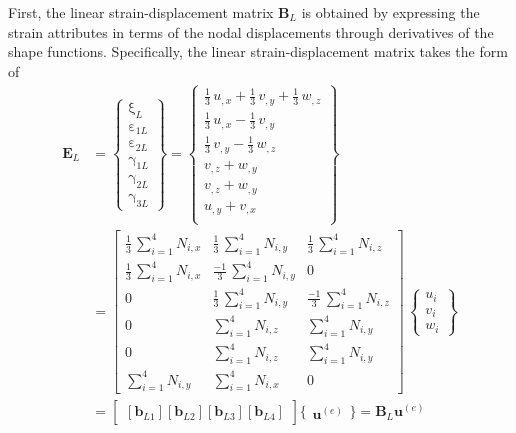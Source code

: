 First, the linear strain-displacement matrix $\mathbf{B}_L$ is obtained by expressing the strain attributes in terms of the nodal displacements through derivatives of the shape functions. Specifically, the linear strain-displacement matrix takes the form of
\begin{equation}
\begin{aligned}
\mathbf{E}_L & =  \begin{Bmatrix}
\mathrm \xi_{L} \\
\mathrm \varepsilon_{1L} \\
\mathrm \varepsilon_{2L} \\
\mathrm \gamma_{1L} \\
\mathrm \gamma_{2L} \\
\mathrm \gamma_{3L}\end{Bmatrix} = 
\begin{Bmatrix}
\tfrac{1}{3} \, u_{,x} + \tfrac{1}{3} \, v_{,y} + \tfrac{1}{3} \, w_{,z} \\
\tfrac{1}{3} \, u_{,x} - \tfrac{1}{3} \, v_{,y} \\
\tfrac{1}{3} \, v_{,y} - \tfrac{1}{3} \, w_{,z} \\
v_{,z} +  w_{,y} \\ 
v_{,z} +  w_{,y} \\ 
u_{,y} +  v_{,x} \\\end{Bmatrix} \\
& = \begin{bmatrix}
\tfrac{1}{3} \, \sum\nolimits_{i=1}^4 N_{i,x}  & \tfrac{1}{3} \, \sum\nolimits_{i=1}^4 N_{i,y} & \tfrac{1}{3} \, \sum\nolimits_{i=1}^4 N_{i,z} \\
\tfrac{1}{3} \, \sum\nolimits_{i=1}^4 N_{i,x}  & \tfrac{-1}{3} \, \sum\nolimits_{i=1}^4 N_{i,y} & 0 \\ 
0 & \tfrac{1}{3} \, \sum\nolimits_{i=1}^4 N_{i,y}  &  \tfrac{-1}{3} \, \sum\nolimits_{i=1}^4 N_{i,z} \\  
0 & \sum\nolimits_{i=1}^4 N_{i,z}  &  \sum\nolimits_{i=1}^4 N_{i,y} \\ 
0 & \sum\nolimits_{i=1}^4 N_{i,z}  &  \sum\nolimits_{i=1}^4 N_{i,y} \\ 
\sum\nolimits_{i=1}^4 N_{i,y}  &  \sum\nolimits_{i=1}^4 N_{i,x} & 0 \end{bmatrix} \, \begin{Bmatrix}
u_{i} \\
v_{i} \\
w_{i} \end{Bmatrix} \\
& = \begin{bmatrix}
[\mathbf{b}_{L1}] [\mathbf{b}_{L2}] [\mathbf{b}_{L3}] [\mathbf{b}_{L4}]
\end{bmatrix} \bigl\{ \begin{matrix} \mathbf{u}^{(e)} \end{matrix} \bigr\} 
= \mathbf{B}_L  \mathbf{u}^{(e)}  
\end{aligned}
\end{equation}
